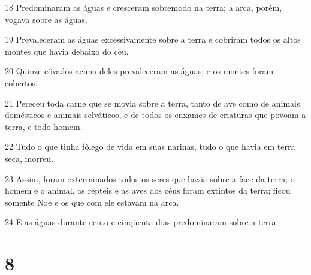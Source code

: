 \par 18 Predominaram as águas e cresceram sobremodo na terra; a arca, porém, vogava sobre as águas.
\par 19 Prevaleceram as águas excessivamente sobre a terra e cobriram todos os altos montes que havia debaixo do céu.
\par 20 Quinze côvados acima deles prevaleceram as águas; e os montes foram cobertos.
\par 21 Pereceu toda carne que se movia sobre a terra, tanto de ave como de animais domésticos e animais selváticos, e de todos os enxames de criaturas que povoam a terra, e todo homem.
\par 22 Tudo o que tinha fôlego de vida em suas narinas, tudo o que havia em terra seca, morreu.
\par 23 Assim, foram exterminados todos os seres que havia sobre a face da terra; o homem e o animal, os répteis e as aves dos céus foram extintos da terra; ficou somente Noé e os que com ele estavam na arca.
\par 24 E as águas durante cento e cinqüenta dias predominaram sobre a terra.

\chapter{8}

